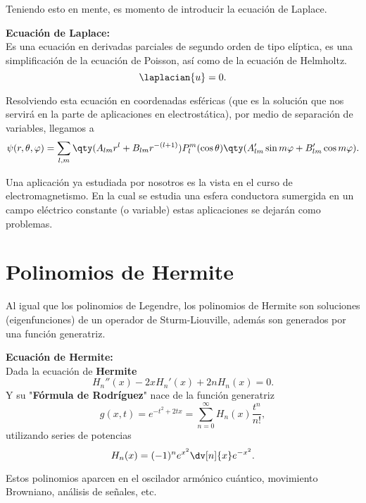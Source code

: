 Teniendo esto en mente, es momento de introducir la ecuación de Laplace.




\begin{mdframed}[style=warning]
	{\Large \textbf{Ecuación de Laplace:}} \\
	Es una ecuación en derivadas parciales de segundo orden de tipo elíptica, es una simplificación de la ecuación de Poisson, así como de la ecuación de Helmholtz.
		$$ \laplacian{u} = 0. $$
\end{mdframed}


Resolviendo esta ecuación en coordenadas esféricas (que es la solución que nos servirá en la parte de aplicaciones en electrostática), por medio de separación de variables, llegamos a
	$$ \psi (r,\theta ,\varphi) = \sum _{l,m} \qty(A_{lm} r^l + B_{lm} r^{-(l + 1)}) P_l ^m (\cos{\theta}) \qty(A_{lm} ^\prime \sin{m\varphi} + B_{lm} ^\prime \cos{m\varphi}). $$
	
Una aplicación ya estudiada por nosotros es la vista en el curso de electromagnetismo. En la cual se estudia una esfera conductora sumergida en un campo eléctrico constante (o variable) estas aplicaciones se dejarán como problemas.







\section*{Polinomios de Hermite}
Al igual que los polinomios de Legendre, los polinomios de Hermite son soluciones (eigenfunciones) de un operador de Sturm-Liouville, además son generados por una función generatriz.

\begin{mdframed}[style=warning]
	{\Large \textbf{Ecuación de Hermite:}} \\
	Dada la ecuación de \textbf{Hermite}
		$$ H_n '' (x) - 2xH_n '(x) + 2nH_n (x) = 0. $$
	Y su "\textbf{Fórmula de Rodríguez}" nace de la función generatriz
		$$ g(x,t) = e^{-t^2 + 2tx} = \sum _{n = 0} ^\infty H_n (x) \frac{t^n}{n!}, $$
	utilizando series de potencias
		$$ H_n (x) = (-1)^n e^{x^2} \dv[n]{x} e^{-x^2}. $$
\end{mdframed}

Estos polinomios aparcen en el oscilador armónico cuántico, movimiento Browniano, análisis de señales, etc.











